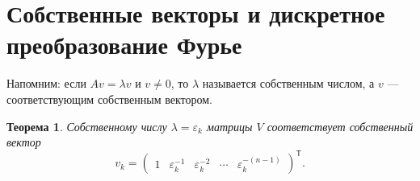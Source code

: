\documentclass[12pt,a4paper]{article}
\newtheorem{theorem}{Теорема}
\theoremstyle{definition}
\theoremstyle{remark}
\newcommand{\eps}{\varepsilon}
\begin{document}
\section{Собственные векторы и дискретное преобразование Фурье}

Напомним: если $Av=\lambda v$ и $v\ne0$, то $\lambda$ называется
собственным числом, а $v$ --- соответствующим собственным вектором.

\begin{theorem}
Собственному числу $\lambda=\eps_k$ матрицы $V$ соответствует собственный
вектор
\[
  v_k=
  \begin{pmatrix}
    1 & \eps_k^{-1} & \eps_k^{-2} & \cdots &
    \eps_k^{-(n-1)}
  \end{pmatrix}^{\mathsf T}.
\]
\end{theorem}
\end{document}
